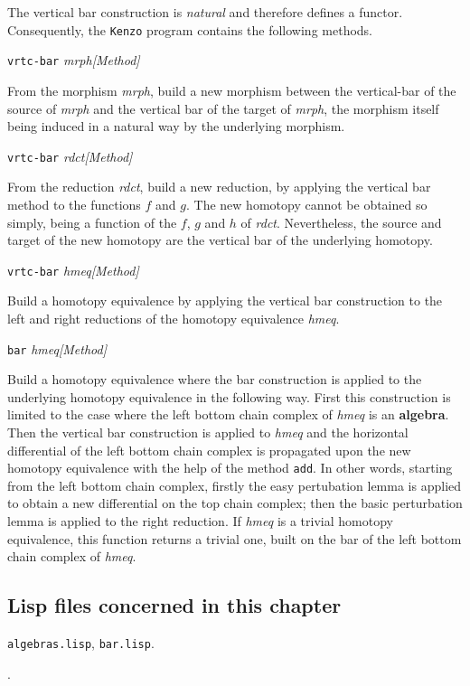 The vertical bar construction is {\em natural}
and therefore defines a functor.
Consequently, the {\tt Kenzo} program contains the following methods.
\vskip 0.45cm
{\parindent=0mm
{\leftskip=5mm
{\tt vrtc-bar} {\em mrph}\hfill {\em [Method]} \par}
{\leftskip=15mm
From the morphism {\em mrph}, build a new morphism between the vertical-bar of the source
of {\em mrph} and the vertical bar of the target of {\em mrph}, the morphism itself being
induced in a natural way by the underlying morphism. \par}
{\leftskip=5mm
{\tt vrtc-bar} {\em rdct}\hfill {\em [Method]} \par}
{\leftskip=15mm
From the reduction {\em rdct}, build a new reduction, by applying the vertical bar
method to the functions $f$ and $g$. The new homotopy cannot be obtained so simply, being
a function of the $f$, $g$ and $h$ of {\em rdct}. Nevertheless, the source and target
of the new homotopy are the vertical bar of the underlying homotopy. \par}
{\leftskip=5mm
{\tt vrtc-bar} {\em hmeq}\hfill {\em [Method]} \par}
{\leftskip=15mm
Build a homotopy equivalence by applying the vertical bar cons\-truc\-ti\-on
to the left and right reductions of the homotopy equivalence {\em hmeq}. \par}
{\leftskip=5mm
{\tt bar} {\em hmeq}\hfill {\em [Method]} \par}
{\leftskip=15mm
Build a  homotopy equivalence where the bar construction is applied to the
underlying homotopy equivalence in the following way. First this construction is limited to the
case where the left bottom chain complex of {\em hmeq} is an {\bf algebra}. Then the vertical bar
construction is applied to {\em hmeq} and the horizontal differential of the left bottom chain complex
is propagated upon the new homotopy equivalence with the help of the method {\tt add}. In other words,
starting from the left bottom chain complex, firstly the easy pertubation lemma is applied to
obtain a new differential on the top chain complex; then the basic perturbation lemma
is applied to the right reduction.
If {\em hmeq} is a trivial homotopy equivalence, this function returns a trivial one,
built on the bar of the left bottom chain complex of {\em hmeq}. \par}
}

\subsection* {Lisp files concerned in this chapter}

{\tt algebras.lisp}, {\tt bar.lisp}.
\par
[{\tt classes.lisp}, {\tt macros.lisp}, {\tt various.lisp}].
